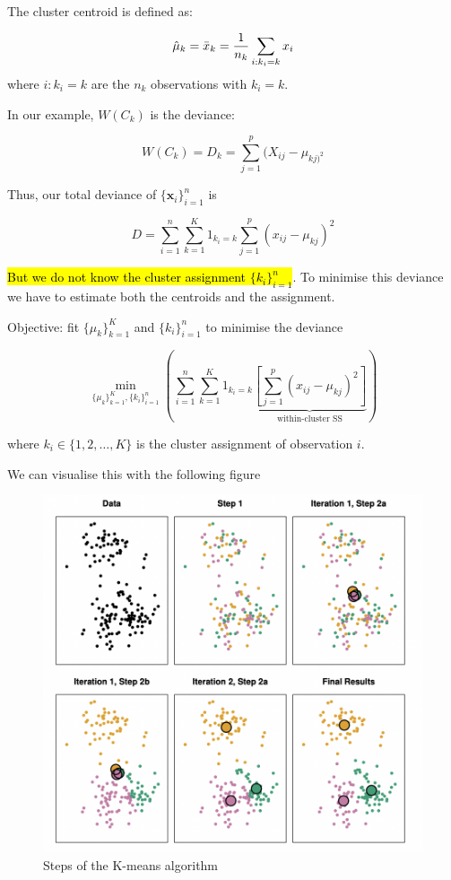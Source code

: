\documentclass[11pt]{article}
\begin{document}
The cluster centroid is defined as:

\begin{equation*}
    \hat{\mu}_k = \Bar{x}_k = \dfrac{1}{n_k}\sum_{i:k_i = k}x_i
\end{equation*}
where $i: k_i = k$ are the $n_k$ observations with $k_i = k$.

In our example, $W(C_k)$ is the deviance:

\begin{equation*}
    W(C_k) = D_k = \sum_{j=1}^p (X_{ij} - \mu_{kj)^2}
\end{equation*}

Thus, our total deviance of $\{\mathbf{x}_i\}_{i=1}^n$ is 

\begin{equation*}
    D = \sum_{i=1}^n \sum_{k=1}^K 1_{k_i = k} \sum_{j=1}^p (x_{ij} - \mu_{kj})^2
\end{equation*}

\hl{But we do not know the cluster assignment $\{k_i\}_{i=1}^n$}. To minimise this deviance we have to estimate both the centroids and the assignment.

Objective: fit $\{\mu_k\}_{k=1}^K$ and $\{k_i\}_{i=1}^n$ to minimise the deviance

\begin{equation}
    \underset{\{\mu_k\}_{k=1}^K,\{k_i\}_{i=1}^n}{\min}\left(\sum_{i=1}^n \sum_{k=1}^K 1_{k_i = k} \underbrace{\left[\sum_{j=1}^p (x_{ij} - \mu_{kj})^2\right]}_{\text{within-cluster SS}}\right)
\end{equation}

where $k_i \in \{1,2,\ldots, K\}$ is the cluster assignment of observation $i$.

We can visualise this with the following figure

\begin{figure}[h]
    \centering
    \includegraphics[width=13cm]{pic/k-means algo.png}
    \caption{Steps of the K-means algorithm}
    \label{fig:k-means algo}
\end{figure}
\end{document}
